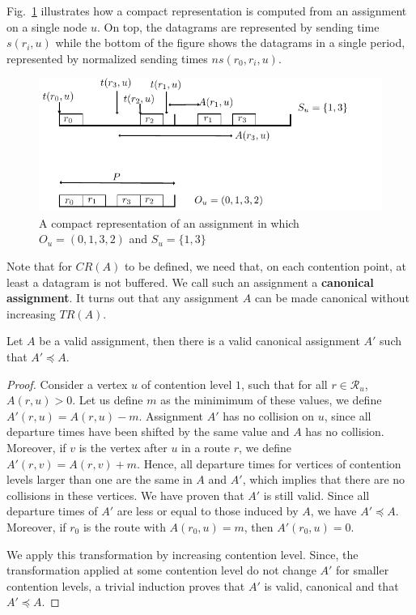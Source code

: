 \documentclass[english]{article}
\begin{document}
Fig.~\ref{fig:normalizedassignment} illustrates how a compact representation is computed from an assignment on a single node $u$. On top, the datagrams are represented by sending time $s(r_i,u)$ while the bottom of the figure shows the datagrams in a single period, represented by normalized sending times $ns(r_0,r_i,u)$.  
\begin{figure}[!h]
	\centering
	\includegraphics[scale=1]{normalizedassignment}
\caption{A compact representation of an assignment in which $O_u = (0,1,3,2)$ and $S_u = \{1,3\}$ }
\label{fig:normalizedassignment}
\end{figure}


Note that for $CR(A)$ to be defined, we need that, on each contention point, at least a datagram is not buffered. We call such an assignment a \textbf{canonical assignment}. It turns out that any assignment $A$ can be made canonical without increasing $TR(A)$.

\begin{lemma}\label{lemma:canonical_min}
Let $A$ be a valid assignment, then there is a valid canonical assignment $A'$ such that $A' \preceq A$.
\end{lemma}
\begin{proof}
Consider a vertex $u$ of contention level $1$, such that for all $r \in \mathcal{R}_u$, $A(r,u) > 0$. Let us define $m$ as the minimimum of these values, we define $A'(r,u) = A(r,u) - m$. Assignment $A'$ has no collision on $u$, since all departure times have been shifted by the same value and $A$ has no collision. Moreover, if $v$ is the vertex after $u$ in a route $r$, we define  $A'(r,v) = A(r,v) + m$. Hence, all departure times for vertices of contention levels larger than one are the same in $A$ and $A'$, which implies that there are no collisions in these vertices. We have proven that $A'$ is still valid. Since all departure times of $A'$ are less or equal to those induced by $A$, we have $A' \preceq A$. Moreover, if $r_0$ is the route with $A(r_0,u) = m$, then $A'(r_0,u) = 0$. 

We apply this transformation by increasing contention level. Since, the transformation applied at some contention level do not change $A'$ for smaller contention levels, a trivial induction proves that $A'$ is valid, canonical and that $A' \preceq A$.
\end{proof}
\end{document}
